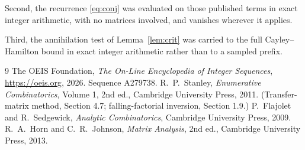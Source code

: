 \documentclass[11pt,a4paper]{article}
\theoremstyle{plain}
\theoremstyle{definition}
\begin{document}
Second, the recurrence \eqref{eq:conj} was evaluated on those published terms in exact
integer arithmetic, with no matrices involved, and vanishes wherever it applies.

Third, the annihilation test of Lemma~\ref{lem:crit} was carried to the full
Cayley--Hamilton bound in exact integer arithmetic rather than to a sampled prefix.

\begin{thebibliography}{9}
 The OEIS Foundation, \emph{The On-Line Encyclopedia of Integer
Sequences}, \url{https://oeis.org}, 2026. Sequence A279738.
 R.~P.~Stanley, \emph{Enumerative Combinatorics}, Volume 1, 2nd ed.,
Cambridge University Press, 2011. (Transfer-matrix method, Section 4.7; falling-factorial
inversion, Section 1.9.)
 P.~Flajolet and R.~Sedgewick, \emph{Analytic Combinatorics}, Cambridge
University Press, 2009.
 R.~A.~Horn and C.~R.~Johnson, \emph{Matrix Analysis}, 2nd ed., Cambridge
University Press, 2013.
\end{thebibliography}
\end{document}
